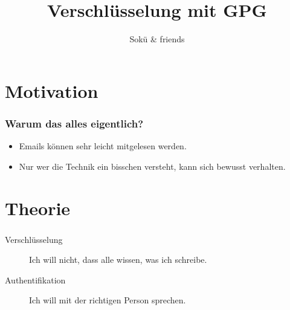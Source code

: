 \documentclass[compress]{beamer}
\begin{document}
\title{Verschlüsselung mit GPG}  
\author{Sokü \& friends}
\date{} 

\frame{\titlepage} 


\section{Motivation}
\label{sec:motivation}

\begin{frame}
  \frametitle{Warum das alles eigentlich?}

  \begin{itemize}[<+(1)->]
  \item Emails können sehr leicht mitgelesen werden.
  \item Nur wer die Technik ein bisschen versteht, kann sich bewusst
    verhalten.
  \end{itemize}
\end{frame}

\section{Theorie}
\label{sec:theorie}
\begin{frame}
    \frametitle{\insertsection}
    \begin{description}
        \item[Verschlüsselung] Ich will nicht, dass alle wissen, was ich schreibe.
        \item[Authentifikation] Ich will mit der richtigen Person sprechen.
    \end{description}
\end{frame}
\end{document}
